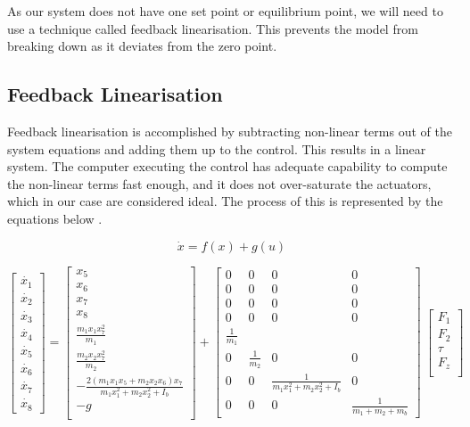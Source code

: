 \documentclass{UoNMCHA}
\numberwithin{equation}{section}
\begin{document}
	As our system does not have one set point or equilibrium point, we will need to use a technique called
	feedback linearisation. This prevents the model from breaking down as it deviates from the zero point.
	
	\newpage
	\subsection{Feedback Linearisation}
	
Feedback linearisation is accomplished by subtracting non-linear terms out of the system equations and adding them up to the control. This results in a linear system. The computer executing the control has adequate capability to compute the non-linear terms fast enough, and it does not over-saturate the actuators, which in our case are considered ideal. The process of this is represented by the equations below \cite{franklin_2015_feedback}.

	\begin{equation}
		\dot{x}=f(x)+g(u)
	\end{equation}
	
	\begin{equation} \label{eq/fxgu}
	\begin{bmatrix}
	\dot{x_{1}} \\
	\dot{x_{2}} \\
	\dot{x_{3}} \\
	\dot{x_{4}} \\
	\dot{x_{5}} \\
	\dot{x_{6}} \\
	\dot{x_{7}} \\
	\dot{x_{8}}
	\end{bmatrix} = 
	\begin{bmatrix}
	x_{5} \\
	x_{6} \\
	x_{7} \\
	x_{8} \\
	\frac{m_1 x_1 x_7^2}{m_1} \\
	\frac{m_2 x_2 x_7^2}{m_2} \\
	-\frac{2(m_1 x_1 x_5 + m_2 x_2 x_6)x_7}{m_1 x_1^2 + m_2x_2^2 + I_b} \\
	-g \\
	\end{bmatrix} +
	\begin{bmatrix}
	0 & 0 & 0 & 0 \\
	0 & 0 & 0 & 0 \\
	0 & 0 & 0 & 0 \\
	0 & 0 & 0 & 0 \\
	\frac{1}{m_{1}} & & & \\
	0 & \frac{1}{m_{2}} & 0 & 0 \\
	0 & 0 & \frac{1}{m_1 x_1^2 + m_2 x_2^2 + I_b} & 0 \\
	0 & 0 & 0 & \frac{1}{m_1  + m_2  + m_b}
	\end{bmatrix}\ 
	\begin{bmatrix}
	F_1 \\
	F_2 \\
	\tau \\
	F_z \\
	\end{bmatrix}
	\end{equation}
	
\end{document}
